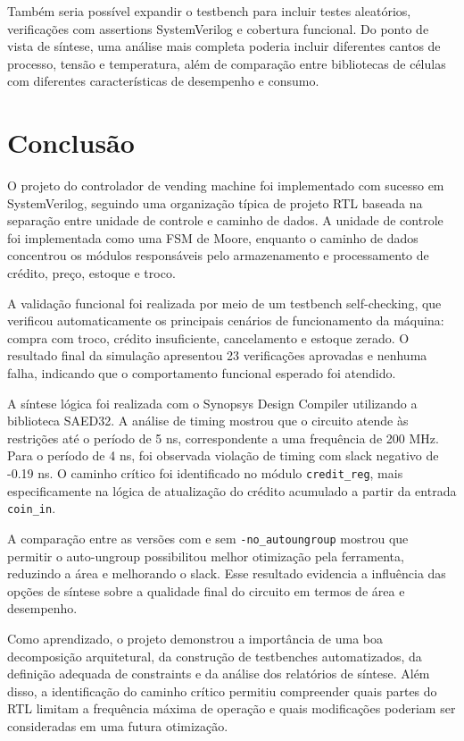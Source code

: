 \documentclass[11pt,a4paper]{article}
\begin{document}
Também seria possível expandir o testbench para incluir testes aleatórios, verificações com assertions SystemVerilog e cobertura funcional. Do ponto de vista de síntese, uma análise mais completa poderia incluir diferentes cantos de processo, tensão e temperatura, além de comparação entre bibliotecas de células com diferentes características de desempenho e consumo.

\section{Conclusão}

O projeto do controlador de vending machine foi implementado com sucesso em SystemVerilog, seguindo uma organização típica de projeto RTL baseada na separação entre unidade de controle e caminho de dados. A unidade de controle foi implementada como uma FSM de Moore, enquanto o caminho de dados concentrou os módulos responsáveis pelo armazenamento e processamento de crédito, preço, estoque e troco.

A validação funcional foi realizada por meio de um testbench self-checking, que verificou automaticamente os principais cenários de funcionamento da máquina: compra com troco, crédito insuficiente, cancelamento e estoque zerado. O resultado final da simulação apresentou 23 verificações aprovadas e nenhuma falha, indicando que o comportamento funcional esperado foi atendido.

A síntese lógica foi realizada com o Synopsys Design Compiler utilizando a biblioteca SAED32. A análise de timing mostrou que o circuito atende às restrições até o período de 5 ns, correspondente a uma frequência de 200 MHz. Para o período de 4 ns, foi observada violação de timing com slack negativo de -0.19 ns. O caminho crítico foi identificado no módulo \texttt{credit\_reg}, mais especificamente na lógica de atualização do crédito acumulado a partir da entrada \texttt{coin\_in}.

A comparação entre as versões com e sem \texttt{-no\_autoungroup} mostrou que permitir o auto-ungroup possibilitou melhor otimização pela ferramenta, reduzindo a área e melhorando o slack. Esse resultado evidencia a influência das opções de síntese sobre a qualidade final do circuito em termos de área e desempenho.

Como aprendizado, o projeto demonstrou a importância de uma boa decomposição arquitetural, da construção de testbenches automatizados, da definição adequada de constraints e da análise dos relatórios de síntese. Além disso, a identificação do caminho crítico permitiu compreender quais partes do RTL limitam a frequência máxima de operação e quais modificações poderiam ser consideradas em uma futura otimização.
\end{document}
